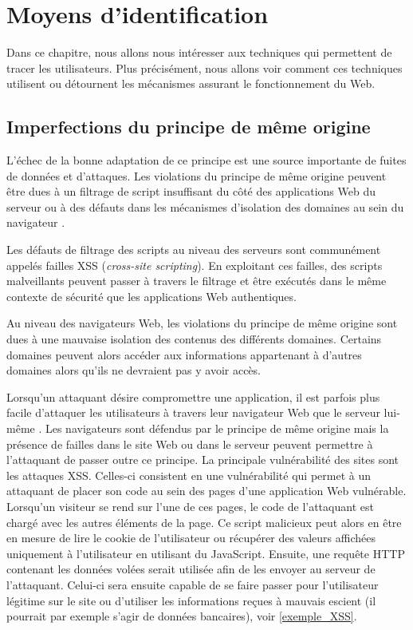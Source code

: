 \chapter{Moyens d'identification}
Dans ce chapitre, nous allons nous intéresser aux techniques qui permettent de tracer les utilisateurs. Plus précisément, nous allons voir comment ces techniques utilisent ou détournent les mécanismes assurant le fonctionnement du Web.

\section{Imperfections du principe de même origine}
\label{imperfections_sop}
L'échec de la bonne adaptation de ce principe est une source importante de fuites de données et d'attaques. Les violations du principe de même origine peuvent être dues à un filtrage de script insuffisant du côté des applications Web du serveur ou à des défauts dans les mécanismes d'isolation des domaines au sein du navigateur \cite{Chen:2007:ABD:1315245.1315248}.

Les défauts de filtrage des scripts au niveau des serveurs sont communément appelés failles XSS (\textit{cross-site scripting}). En exploitant ces failles, des scripts malveillants peuvent passer à travers le filtrage et être exécutés dans le même contexte de sécurité que les applications Web authentiques.

Au niveau des navigateurs Web, les violations du principe de même origine sont dues à une mauvaise isolation des contenus des différents domaines. Certains domaines peuvent alors accéder aux informations appartenant à d'autres domaines alors qu'ils ne devraient pas y avoir accès.
\newline

Lorsqu'un attaquant désire compromettre une application, il est parfois plus facile d'attaquer les utilisateurs à travers leur navigateur Web que le serveur lui-même \cite{sullivan2011web}. Les navigateurs sont défendus par le principe de même origine mais la présence de failles dans le site Web ou dans le serveur peuvent permettre à l'attaquant de passer outre ce principe. La principale vulnérabilité des sites sont les attaques XSS. Celles-ci consistent en une vulnérabilité qui permet à un attaquant de placer son code au sein des pages d'une application Web vulnérable. Lorsqu'un visiteur se rend sur l'une de ces pages, le code de l'attaquant est chargé avec les autres éléments de la page. Ce script malicieux peut alors en être en mesure de lire le cookie de l'utilisateur ou récupérer des valeurs affichées uniquement à l'utilisateur en utilisant du JavaScript. Ensuite, une requête HTTP contenant les données volées serait utilisée afin de les envoyer au serveur de l'attaquant. Celui-ci sera ensuite capable de se faire passer pour l'utilisateur légitime sur le site ou d'utiliser les informations reçues à mauvais escient (il pourrait par exemple s'agir de données bancaires), voir \autoref{exemple_XSS}.
\newline

